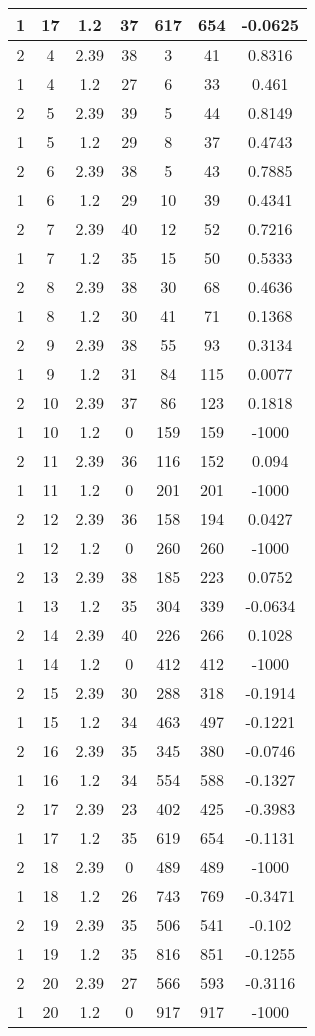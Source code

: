 \documentclass[letterpaper, 12pt]{article}
\begin{document}
\begin{longtable}{|c|c|c|c|c|c|c|}
\hline
1 & 17 & 1.2 & 37 & 617 & 654 & -0.0625 \\
\hline
2 & 4 & 2.39 & 38 & 3 & 41 & 0.8316 \\
\hline
1 & 4 & 1.2 & 27 & 6 & 33 & 0.461 \\
\hline
2 & 5 & 2.39 & 39 & 5 & 44 & 0.8149 \\
\hline
1 & 5 & 1.2 & 29 & 8 & 37 & 0.4743 \\
\hline
2 & 6 & 2.39 & 38 & 5 & 43 & 0.7885 \\
\hline
1 & 6 & 1.2 & 29 & 10 & 39 & 0.4341 \\
\hline
2 & 7 & 2.39 & 40 & 12 & 52 & 0.7216 \\
\hline
1 & 7 & 1.2 & 35 & 15 & 50 & 0.5333 \\
\hline
2 & 8 & 2.39 & 38 & 30 & 68 & 0.4636 \\
\hline
1 & 8 & 1.2 & 30 & 41 & 71 & 0.1368 \\
\hline
2 & 9 & 2.39 & 38 & 55 & 93 & 0.3134 \\
\hline
1 & 9 & 1.2 & 31 & 84 & 115 & 0.0077 \\
\hline
2 & 10 & 2.39 & 37 & 86 & 123 & 0.1818 \\
\hline
1 & 10 & 1.2 & 0 & 159 & 159 & -1000 \\
\hline
2 & 11 & 2.39 & 36 & 116 & 152 & 0.094 \\
\hline
1 & 11 & 1.2 & 0 & 201 & 201 & -1000 \\
\hline
2 & 12 & 2.39 & 36 & 158 & 194 & 0.0427 \\
\hline
1 & 12 & 1.2 & 0 & 260 & 260 & -1000 \\
\hline
2 & 13 & 2.39 & 38 & 185 & 223 & 0.0752 \\
\hline
1 & 13 & 1.2 & 35 & 304 & 339 & -0.0634 \\
\hline
2 & 14 & 2.39 & 40 & 226 & 266 & 0.1028 \\
\hline
1 & 14 & 1.2 & 0 & 412 & 412 & -1000 \\
\hline
2 & 15 & 2.39 & 30 & 288 & 318 & -0.1914 \\
\hline
1 & 15 & 1.2 & 34 & 463 & 497 & -0.1221 \\
\hline
2 & 16 & 2.39 & 35 & 345 & 380 & -0.0746 \\
\hline
1 & 16 & 1.2 & 34 & 554 & 588 & -0.1327 \\
\hline
2 & 17 & 2.39 & 23 & 402 & 425 & -0.3983 \\
\hline
1 & 17 & 1.2 & 35 & 619 & 654 & -0.1131 \\
\hline
2 & 18 & 2.39 & 0 & 489 & 489 & -1000 \\
\hline
1 & 18 & 1.2 & 26 & 743 & 769 & -0.3471 \\
\hline
2 & 19 & 2.39 & 35 & 506 & 541 & -0.102 \\
\hline
1 & 19 & 1.2 & 35 & 816 & 851 & -0.1255 \\
\hline
2 & 20 & 2.39 & 27 & 566 & 593 & -0.3116 \\
\hline
1 & 20 & 1.2 & 0 & 917 & 917 & -1000 \\
\hline
\end{longtable}
\end{document}
